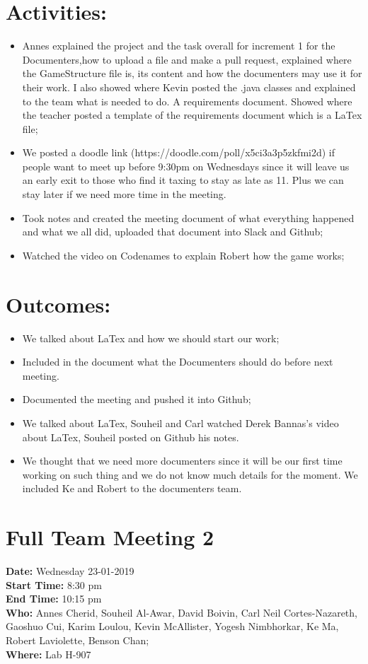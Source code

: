 \documentclass[12pt]{article}
\begin{document}
\section{Activities:} 
\begin{itemize}
\item Annes explained the project and the task overall for increment 1 for the Documenters,how to upload a file and make a pull request, explained where the GameStructure file is, its content and how the documenters may use it for their work. I also showed where Kevin posted the .java classes and explained to the team what is needed to do. A requirements document. Showed where the teacher posted a template of the requirements document which is a LaTex file;\\
\item We posted a doodle link (https://doodle.com/poll/x5ci3a3p5zkfmi2d) if people want to meet up before 9:30pm on Wednesdays since it will leave us an early exit to those who find it taxing to stay as late as 11. Plus we can stay later if we need more time in the meeting.
\item Took notes and created the meeting document of what everything happened and what we all did, uploaded that document into Slack and Github;
\item Watched the video on Codenames to explain Robert how the game works;
\end {itemize}
\section{Outcomes:} 
\begin{itemize}
\item We talked about LaTex and how we should start our work;
\item Included in the document what the Documenters should do before next meeting.
 \item Documented the meeting and pushed it into Github;
 \item We talked about LaTex, Souheil and Carl watched Derek Bannas’s video about LaTex, Souheil posted on Github his notes.
 \item We thought that we need more documenters since it will be our first time working on such thing and we do not know much details for the moment. We included Ke and Robert to the documenters team. 
\end {itemize}



\section {Full Team Meeting 2}
{\bf Date:} Wednesday 23-01-2019\\
{\bf Start Time:} 8:30 pm\\
{\bf End Time:} 10:15 pm \\
{\bf Who:} Annes Cherid, Souheil Al-Awar, David Boivin, Carl Neil Cortes-Nazareth, Gaoshuo Cui, Karim	Loulou, Kevin McAllister, Yogesh Nimbhorkar, Ke Ma, Robert Laviolette, Benson Chan;\\
{\bf Where:} Lab H-907 \\
\end{document}
